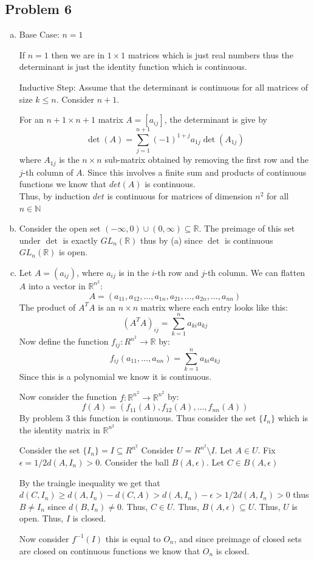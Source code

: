 \documentclass[12pt, letterpaper]{article}
\theoremstyle{definition}
\newcommand{\R}{\mathbb{R}}
\newcommand{\N}{\mathbb{N}}
\begin{document}
\subsection*{Problem 6}
\begin{enumerate}[(a)]
    \item Base Case: $n=1$
    
    If $n=1$ then we are in $1\times1$ matrices which is just real numbers thus the determinant is just the identity function which is continuous.

    Inductive Step: Assume that the determinant is continuous for all matrices of size $k \leq n$. Consider $n+1$.

    For an $n+1 \times n+1$ matrix $A=[a_{ij}]$, the determinant is give by
    \[\det(A)=\sum_{j=1}^{n+1}(-1)^{1+j}a_{1j}\det(A_{1j})\]
    where $A_{1j}$ is the $n \times n$ sub-matrix obtained by removing the first row and the $j$-th column of $A$.
    Since this involves a finite sum  and products of continuous functions we know that $det(A)$ is continuous.\\
    Thus, by induction $det$ is continuous for matrices of dimension $n^2$ for all $n \in \N$

    \item Consider the open set $(-\infty, 0) \cup (0, \infty) \subseteq \R$. The preimage of this set under $\det$ is exactly $GL_n(\R)$ thus by (a) since $\det$ is continuous $GL_n(\R)$ is open.
    
    \item Let $A=(a_{ij})$, where $a_{ij}$ is in the $i$-th row and $j$-th column. We can flatten $A$ into a vector in $\R^{n^2}$:
    \[A=(a_{11},a_{12},\dots,a_{1n},a_{21},\dots,a_{2n},\dots,a_{nn})\]
    The product of $A^TA$ is an $n \times n$ matrix where each entry looks like this:
    \[(A^TA)_{ij}=\sum_{k=1}^na_{ki}a_{kj}\]
    Now define the function $f_{ij}:R^{n^2} \to \R$ by:
    \[f_{ij}(a_{11},\dots,a_{nn})=\sum_{k=1}^na_{ki}a_{kj}\]
    Since this is a polynomial we know it is continuous.

    Now consider the function $f: \R^{n^2} \to \R^{n^2}$ by:
    \[f(A)=(f_{11}(A),f_{12}(A),\dots,f_{nn}(A))\]
    By problem 3 this function is continuous. Thus consider the set $\{I_n\}$ which is the identity matrix in $\R^{n^2}$

    Consider the set $\{I_n\}=I \subseteq R^{n^2}$ Consider $U=R^{n^2} \setminus I$. Let $A \in U$. Fix $\epsilon=1/2d(A,I_n) >0$. Consider the ball $B(A,\epsilon)$. Let $C \in B(A, \epsilon)$

    By the traingle inequality we get that $d(C,I_n) \geq d(A,I_n)-d(C,A) > d(A,I_n)-\epsilon > 1/2d(A,I_n) > 0$ thus $B \neq I_n$ since $d(B,I_n) \neq 0$. Thus, $C \in U$. Thus, $B(A,\epsilon) \subseteq U$. Thus, $U$ is open. Thus, $I$ is closed.

    Now consider $f^{-1}(I)$ this is equal to $O_n$, and since preimage of closed sets are closed on continuous functions we know that $O_n$ is closed.
\end{enumerate}
\end{document}
